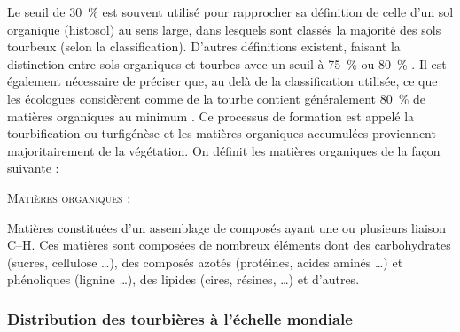 Le seuil de \SI{30}{\percent} est souvent utilisé pour rapprocher sa définition de celle d'un sol organique (histosol) au sens large, dans lesquels sont classés la majorité des sols tourbeux (selon la classification).
D'autres définitions existent, faisant la distinction entre sols organiques et tourbes avec un seuil à \SI{75}{\percent} \citep{andrejko1983} ou \SI{80}{\percent} \citep{landva1983}.
Il est également nécessaire de préciser que, au delà de la classification utilisée, ce que les écologues considèrent comme de la tourbe contient généralement \SI{80}{\percent} de matières organiques au minimum \citep{rydin2013b}.
Ce processus de formation est appelé la tourbification ou turfigénèse et les matières organiques accumulées proviennent majoritairement de la végétation.
On définit les matières organiques de la façon suivante : 
\begin{pdef}
\textsc{Matières organiques} :

Matières constituées d'un assemblage de composés ayant une ou plusieurs liaison C--H.
Ces matières sont composées de nombreux éléments dont des carbohydrates (sucres, cellulose \dots), des composés azotés (protéines, acides aminés \dots) et phénoliques (lignine \dots), des lipides (cires, résines, \dots) et d'autres\footnotemark.

\end{pdef}


\subsubsection{Distribution des tourbières à l'échelle mondiale}

